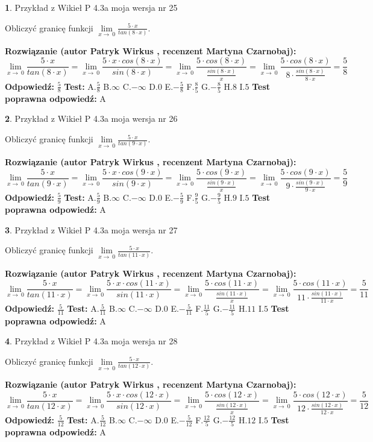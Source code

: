 \documentclass[12pt, a4paper]{article}
\theoremstyle{definition} %
\newtheorem{zad}{}
\newcommand{\zadStart}[1]{\begin{zad}#1\newline}
\newcommand{\zadStop}{\end{zad}}
\newcommand{\rozwStart}[2]{\noindent \textbf{Rozwiązanie (autor #1 , recenzent #2): }\newline}
\newcommand{\rozwStop}{\newline}
\newcommand{\odpStart}{\noindent \textbf{Odpowiedź:}\newline}
\newcommand{\odpStop}{\newline}
\newcommand{\testStart}{\noindent \textbf{Test:}\newline}
\newcommand{\testStop}{\newline}
\newcommand{\kluczStart}{\noindent \textbf{Test poprawna odpowiedź:}\newline}
\newcommand{\kluczStop}{\newline}
\begin{document}
\zadStart{Przykład z Wikieł P 4.3a moja wersja nr 25}


Obliczyć granicę funkcji $\lim\limits_{x\to\ 0}\frac{5 \cdot x}{tan(8 \cdot x)}$.
\zadStop
\rozwStart{Patryk Wirkus}{Martyna Czarnobaj}
$$\lim\limits_{x\to\ 0}\frac{5 \cdot x}{tan(8 \cdot x)}=\lim\limits_{x\to\ 0}\frac{5 \cdot x \cdot cos(8 \cdot x)}{sin(8 \cdot x)}=\lim\limits_{x\to\ 0}\frac{5 \cdot cos(8 \cdot x)}{\frac{sin(8 \cdot x)}{x}}=\lim\limits_{x\to\ 0}\frac{5 \cdot cos(8 \cdot x)}{8 \cdot \frac{sin(8 \cdot x)}{8 \cdot x}} = \frac{5}{8}$$
\rozwStop
\odpStart
$\frac{5}{8}$
\odpStop
\testStart
A.$\frac{5}{8}$
B.$\infty$
C.$-\infty$
D.$0$
E.$-\frac{5}{8}$
F.$\frac{8}{5}$
G.$-\frac{8}{5}$
H.$8$
I.$5$
\testStop
\kluczStart
A
\kluczStop



\zadStart{Przykład z Wikieł P 4.3a moja wersja nr 26}


Obliczyć granicę funkcji $\lim\limits_{x\to\ 0}\frac{5 \cdot x}{tan(9 \cdot x)}$.
\zadStop
\rozwStart{Patryk Wirkus}{Martyna Czarnobaj}
$$\lim\limits_{x\to\ 0}\frac{5 \cdot x}{tan(9 \cdot x)}=\lim\limits_{x\to\ 0}\frac{5 \cdot x \cdot cos(9 \cdot x)}{sin(9 \cdot x)}=\lim\limits_{x\to\ 0}\frac{5 \cdot cos(9 \cdot x)}{\frac{sin(9 \cdot x)}{x}}=\lim\limits_{x\to\ 0}\frac{5 \cdot cos(9 \cdot x)}{9 \cdot \frac{sin(9 \cdot x)}{9 \cdot x}} = \frac{5}{9}$$
\rozwStop
\odpStart
$\frac{5}{9}$
\odpStop
\testStart
A.$\frac{5}{9}$
B.$\infty$
C.$-\infty$
D.$0$
E.$-\frac{5}{9}$
F.$\frac{9}{5}$
G.$-\frac{9}{5}$
H.$9$
I.$5$
\testStop
\kluczStart
A
\kluczStop



\zadStart{Przykład z Wikieł P 4.3a moja wersja nr 27}


Obliczyć granicę funkcji $\lim\limits_{x\to\ 0}\frac{5 \cdot x}{tan(11 \cdot x)}$.
\zadStop
\rozwStart{Patryk Wirkus}{Martyna Czarnobaj}
$$\lim\limits_{x\to\ 0}\frac{5 \cdot x}{tan(11 \cdot x)}=\lim\limits_{x\to\ 0}\frac{5 \cdot x \cdot cos(11 \cdot x)}{sin(11 \cdot x)}=\lim\limits_{x\to\ 0}\frac{5 \cdot cos(11 \cdot x)}{\frac{sin(11 \cdot x)}{x}}=\lim\limits_{x\to\ 0}\frac{5 \cdot cos(11 \cdot x)}{11 \cdot \frac{sin(11 \cdot x)}{11 \cdot x}} = \frac{5}{11}$$
\rozwStop
\odpStart
$\frac{5}{11}$
\odpStop
\testStart
A.$\frac{5}{11}$
B.$\infty$
C.$-\infty$
D.$0$
E.$-\frac{5}{11}$
F.$\frac{11}{5}$
G.$-\frac{11}{5}$
H.$11$
I.$5$
\testStop
\kluczStart
A
\kluczStop



\zadStart{Przykład z Wikieł P 4.3a moja wersja nr 28}


Obliczyć granicę funkcji $\lim\limits_{x\to\ 0}\frac{5 \cdot x}{tan(12 \cdot x)}$.
\zadStop
\rozwStart{Patryk Wirkus}{Martyna Czarnobaj}
$$\lim\limits_{x\to\ 0}\frac{5 \cdot x}{tan(12 \cdot x)}=\lim\limits_{x\to\ 0}\frac{5 \cdot x \cdot cos(12 \cdot x)}{sin(12 \cdot x)}=\lim\limits_{x\to\ 0}\frac{5 \cdot cos(12 \cdot x)}{\frac{sin(12 \cdot x)}{x}}=\lim\limits_{x\to\ 0}\frac{5 \cdot cos(12 \cdot x)}{12 \cdot \frac{sin(12 \cdot x)}{12 \cdot x}} = \frac{5}{12}$$
\rozwStop
\odpStart
$\frac{5}{12}$
\odpStop
\testStart
A.$\frac{5}{12}$
B.$\infty$
C.$-\infty$
D.$0$
E.$-\frac{5}{12}$
F.$\frac{12}{5}$
G.$-\frac{12}{5}$
H.$12$
I.$5$
\testStop
\kluczStart
A
\kluczStop
\end{document}
